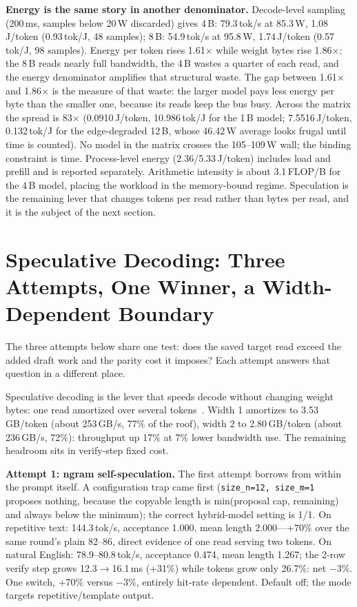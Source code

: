 \documentclass[letterpaper,twocolumn,10pt]{article}
\begin{document}
\textbf{Energy is the same story in another denominator.} Decode-level
sampling (200\,ms, samples below 20\,W discarded) gives 4\,B: 79.3\,tok/s at
85.3\,W, 1.08\,J/token (0.93\,tok/J, 48 samples); 8\,B: 54.9\,tok/s at
95.8\,W, 1.74\,J/token (0.57\,tok/J, 98 samples). Energy per token rises
1.61$\times$ while weight bytes rise 1.86$\times$: the 8\,B reads nearly full
bandwidth, the 4\,B wastes a quarter of each read, and the energy denominator
amplifies that structural waste. The gap between 1.61$\times$ and
1.86$\times$ is the measure of that waste: the larger model pays less energy
per byte than the smaller one, because its reads keep the bus busy. Across the matrix the spread is 83$\times$
(0.0910\,J/token, 10.986\,tok/J for the 1\,B model; 7.5516\,J/token,
0.132\,tok/J for the edge-degraded 12\,B, whose 46.42\,W average looks frugal
until time is counted). No model in the matrix crosses the 105--109\,W wall;
the binding constraint is time. Process-level energy (2.36/5.33\,J/token)
includes load and prefill and is reported separately. Arithmetic intensity is
about 3.1\,FLOP/B for the 4\,B model, placing the workload in the memory-bound
regime. Speculation is the remaining lever that changes tokens per read rather
than bytes per read, and it is the subject of the next section.

\section{Speculative Decoding: Three Attempts, One Winner, a Width-Dependent Boundary}
\label{sec:spec}

The three attempts below share one test: does the saved target read exceed the
added draft work and the parity cost it imposes? Each attempt answers that
question in a different place.

Speculative decoding is the lever that speeds decode without changing weight
bytes: one read amortized over several tokens~\cite{leviathan2023,chen2023spec}.
Width 1 amortizes to
3.53\,GB/token (about 253\,GB/s, 77\% of the roof), width 2 to 2.80\,GB/token
(about 236\,GB/s, 72\%): throughput up 17\% at 7\% lower bandwidth use. The
remaining headroom sits in verify-step fixed cost.

\textbf{Attempt 1: ngram self-speculation.} The first attempt borrows from
within the prompt itself. A configuration trap came first
(\texttt{size\_n=12, size\_m=1} proposes nothing, because the copyable length
is min(proposal cap, remaining) and always below the minimum); the correct
hybrid-model setting is 1/1. On repetitive text: 144.3\,tok/s, acceptance
1.000, mean length 2.000---+70\% over the same round's plain 82--86, direct
evidence of one read serving two tokens. On natural English: 78.9--80.8\,tok/s,
acceptance 0.474, mean length 1.267; the 2-row verify step grows
12.3$\rightarrow$16.1\,ms (+31\%) while tokens grow only 26.7\%: net $-3\%$.
One switch, +70\% versus $-3\%$, entirely hit-rate dependent. Default off; the
mode targets repetitive/template output.
\end{document}
